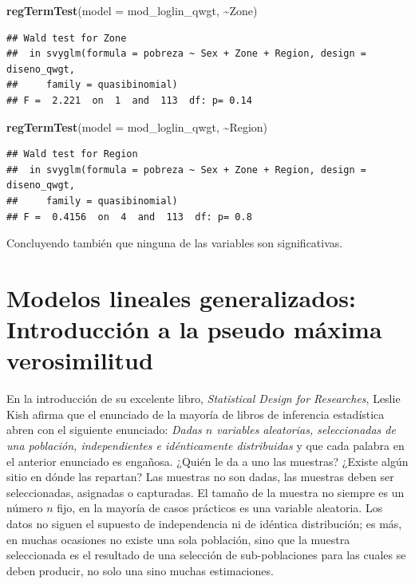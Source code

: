 \documentclass[
  spanish,
  12pt,
]{book}
\newenvironment{Shaded}{\begin{snugshade}}{\end{snugshade}}
\newcommand{\AttributeTok}[1]{\textcolor[rgb]{0.13,0.29,0.53}{#1}}
\newcommand{\FunctionTok}[1]{\textcolor[rgb]{0.13,0.29,0.53}{\textbf{#1}}}
\newcommand{\NormalTok}[1]{#1}
\newcommand{\SpecialCharTok}[1]{\textcolor[rgb]{0.81,0.36,0.00}{\textbf{#1}}}
\begin{document}
\begin{Shaded}
\begin{Highlighting}[]
\FunctionTok{regTermTest}\NormalTok{(}\AttributeTok{model =}\NormalTok{ mod\_loglin\_qwgt, }\SpecialCharTok{\textasciitilde{}}\NormalTok{Zone)}
\end{Highlighting}
\end{Shaded}

\begin{verbatim}
## Wald test for Zone
##  in svyglm(formula = pobreza ~ Sex + Zone + Region, design = diseno_qwgt, 
##     family = quasibinomial)
## F =  2.221  on  1  and  113  df: p= 0.14
\end{verbatim}

\begin{Shaded}
\begin{Highlighting}[]
\FunctionTok{regTermTest}\NormalTok{(}\AttributeTok{model =}\NormalTok{ mod\_loglin\_qwgt, }\SpecialCharTok{\textasciitilde{}}\NormalTok{Region)}
\end{Highlighting}
\end{Shaded}

\begin{verbatim}
## Wald test for Region
##  in svyglm(formula = pobreza ~ Sex + Zone + Region, design = diseno_qwgt, 
##     family = quasibinomial)
## F =  0.4156  on  4  and  113  df: p= 0.8
\end{verbatim}

Concluyendo también que ninguna de las variables son significativas.

\chapter{Modelos lineales generalizados: Introducción a la pseudo máxima verosimilitud}\label{modelos-lineales-generalizados-introducciuxf3n-a-la-pseudo-muxe1xima-verosimilitud}

En la introducción de su excelente libro, \emph{Statistical Design for Researches}, Leslie Kish afirma que el enunciado de la mayoría de libros de inferencia estadística abren con el siguiente enunciado: \emph{Dadas \(n\) variables aleatorias, seleccionadas de una población, independientes e idénticamente distribuidas} y que cada palabra en el anterior enunciado es engañosa. ¿Quién le da a uno las muestras? ¿Existe algún sitio en dónde las repartan? Las muestras no son dadas, las muestras deben ser seleccionadas, asignadas o capturadas. El tamaño de la muestra no siempre es un número \(n\) fijo, en la mayoría de casos prácticos es una variable aleatoria. Los datos no siguen el supuesto de independencia ni de idéntica distribución; es más, en muchas ocasiones no existe una sola población, sino que la muestra seleccionada es el resultado de una selección de sub-poblaciones para las cuales se deben producir, no solo una sino muchas estimaciones.
\end{document}

